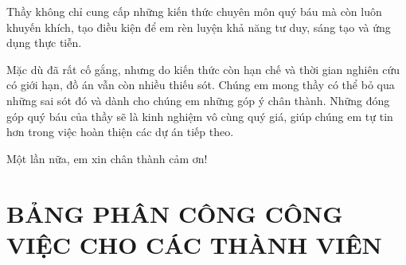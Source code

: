 \documentclass[a4paper,12pt]{article}
\begin{document}
\noindent Thầy không chỉ cung cấp những kiến thức chuyên môn quý báu mà còn luôn khuyến khích, tạo điều kiện để em rèn luyện khả năng tư duy, sáng tạo và ứng dụng thực tiễn.

\noindent Mặc dù đã rất cố gắng, nhưng do kiến thức còn hạn chế và thời gian nghiên cứu có giới hạn, đồ án vẫn còn nhiều thiếu sót. Chúng em mong thầy có thể bỏ qua những sai sót đó và dành cho chúng em những góp ý chân thành. Những đóng góp quý báu của thầy sẽ là kinh nghiệm vô cùng quý giá, giúp chúng em tự tin hơn trong việc hoàn thiện các dự án tiếp theo.

\noindent Một lần nữa, em xin chân thành cảm ơn!

\clearpage
\thispagestyle{empty}

\section*{\centering \fontsize{15pt}{\baselineskip}\selectfont \textbf{BẢNG PHÂN CÔNG CÔNG VIỆC CHO CÁC THÀNH VIÊN}}
\end{document}
